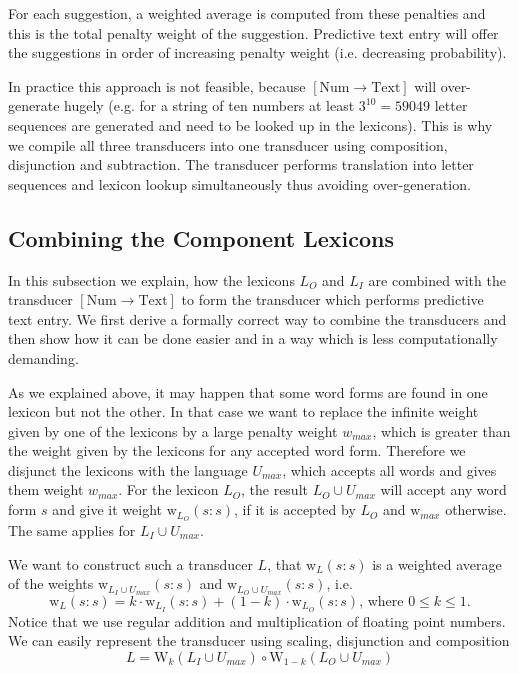 \documentclass[a4paper,conference]{IEEEtran}
\begin{document}
For each suggestion, a weighted average is computed from these
penalties and this is the total penalty weight of the
suggestion. Predictive text entry will offer the suggestions in order
of increasing penalty weight (i.e. decreasing probability).

In practice this approach is not feasible, because
$[\mathrm{Num}\rightarrow\mathrm{Text}]$ will over-generate hugely
(e.g. for a string of ten numbers at least $3^{10} = 59049$ letter
sequences are generated and need to be looked up in the
lexicons). This is why we compile all three transducers into one
transducer using composition, disjunction and subtraction. The
transducer performs translation into letter sequences and lexicon
lookup simultaneously thus avoiding over-generation.

\subsection{Combining the Component Lexicons}

In this subsection we explain, how the lexicons $L_O$ and $L_I$ are
combined with the transducer $[\mathrm{Num}\rightarrow\mathrm{Text}]$
to form the transducer which performs predictive text entry. We first
derive a formally correct way to combine the transducers and then show
how it can be done easier and in a way which is less computationally
demanding.

As we explained above, it may happen that some word forms are found in
one lexicon but not the other. In that case we want to replace the
infinite weight given by one of the lexicons by a large penalty weight
$w_{max}$, which is greater than the weight given by the lexicons for
any accepted word form. Therefore we disjunct the lexicons with the
language $U_{max}$, which accepts all words and gives them weight
$w_{max}$. For the lexicon $L_O$, the result $L_O \cup U_{max}$ will
accept any word form $s$ and give it weight
$\mathrm{w}_{L_O}(s\mathrm{:}s)$, if it is accepted by $L_O$ and
$\mathrm{w}_{max}$ otherwise. The same applies for $L_I \cup U_{max}$.

We want to construct such a transducer $L$, that $\mathrm{w}_L(s\mathrm{:}s)$
is a weighted average of the weights $\mathrm{w}_{L_I \cup U_{max}}(s\mathrm{:}s)$ and
$\mathrm{w}_{L_O \cup U_{max}}(s\mathrm{:}s)$, i.e.
\begin{equation}
  \mathrm{w}_L(s\mathrm{:}s) = k\cdot \mathrm{w}_{L_I}(s\mathrm{:}s) + (1 - k)\cdot \mathrm{w}_{L_O}(s\mathrm{:}s)\text{, where }0\leq k \leq 1\text{.}
\end{equation}
Notice that we use regular addition and multiplication of floating
point numbers. We can easily represent the transducer using scaling, disjunction and composition
\begin{equation}
  L = \mathrm{W}_k(L_I \cup U_{max}) \circ \mathrm{W}_{1-k}(L_O \cup U_{max})
\end{equation}
\end{document}
